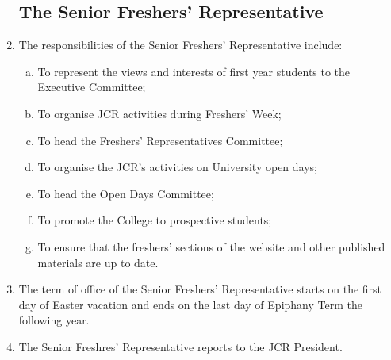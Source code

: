 \documentclass[12pt]{article}
\begin{document}
\begin{enumerate}
    \subsection{The Senior Freshers' Representative}
    \item The responsibilities of the Senior Freshers' Representative include:
    \begin{enumerate}[(a)]
        \item To represent the views and interests of first year students to the Executive Committee;
        \item To organise JCR activities during Freshers' Week;
        \item To head the Freshers' Representatives Committee;
        \item To organise the JCR's activities on University open days;
        \item To head the Open Days Committee;
        \item To promote the College to prospective students;
        \item To ensure that the freshers' sections of the website and other published materials are up to date.
    \end{enumerate}
    \item The term of office of the Senior Freshers' Representative starts on the first day of Easter vacation and ends on the last day of Epiphany Term the following year.
    \item The Senior Freshres' Representative reports to the JCR President.

\end{enumerate}
\end{document}
